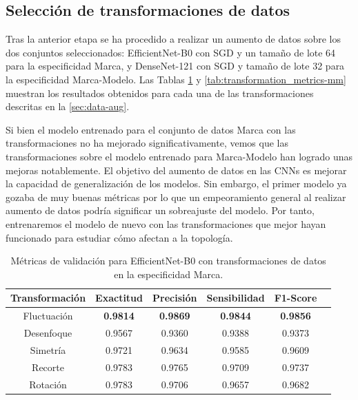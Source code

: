 \subsection{Selección de transformaciones de datos}

Tras la anterior etapa se ha procedido a realizar un aumento de datos sobre los
dos conjuntos seleccionados: EfficientNet-B0 con SGD y un tamaño de lote 64 para
la especificidad Marca, y DenseNet-121 con SGD y tamaño de lote 32 para la
especificidad Marca-Modelo. Las Tablas \ref{tab:transformation_metrics-m} y \ref{tab:transformation_metrics-mm}
muestran los resultados obtenidos para cada una de las transformaciones descritas
en la \autoref{sec:data-aug}.

Si bien el modelo entrenado para el conjunto de datos Marca con las transformaciones
no ha mejorado significativamente, vemos que las transformaciones sobre el
modelo entrenado para Marca-Modelo han logrado unas mejoras notablemente. El objetivo
del aumento de datos en las CNNs es mejorar la capacidad de generalización de los
modelos. Sin embargo, el primer modelo ya gozaba de muy buenas métricas por lo que
un empeoramiento general al realizar aumento de datos podría significar un sobreajuste
del modelo. Por tanto, entrenaremos el modelo de nuevo con las transformaciones que
mejor hayan funcionado para estudiar cómo afectan a la topología.

\begin{table}[H]
	\centering
	\begin{adjustbox}
		{width=0.8\textwidth}
		\begin{tabular}{|c|c|c|c|c|c|}
			\hline
			\textbf{Transformación} & \textbf{Exactitud} & \textbf{Precisión} & \textbf{Sensibilidad} & \textbf{F1-Score} \\
			\hline
			Fluctuación             & \textbf{0.9814}    & \textbf{0.9869}    & \textbf{0.9844}       & \textbf{0.9856}   \\
			\hline
			Desenfoque              & 0.9567             & 0.9360             & 0.9388                & 0.9373            \\
			\hline
			Simetría                & 0.9721             & 0.9634             & 0.9585                & 0.9609            \\
			\hline
			Recorte                 & 0.9783             & 0.9765             & 0.9709                & 0.9737            \\
			\hline
			Rotación                & 0.9783             & 0.9706             & 0.9657                & 0.9682            \\
			\hline
		\end{tabular}
	\end{adjustbox}
	\caption{Métricas de validación para EfficientNet-B0 con transformaciones de
		datos en la especificidad Marca.}
	\label{tab:transformation_metrics-m}
\end{table}

